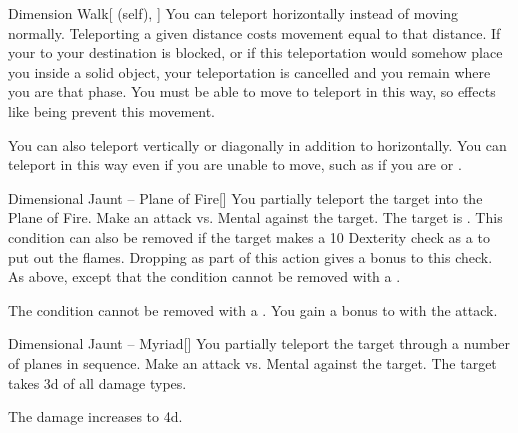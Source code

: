 \lowercase{\hypertarget{spell:Dimension Walk}{}}\label{spell:Dimension Walk}
\begin{attuneability}[Rank 4]{\hypertarget{spell:Dimension Walk}{Dimension Walk}}[ (self), ]
You can teleport horizontally instead of moving normally.
Teleporting a given distance costs movement equal to that distance.
If your  to your destination is blocked, or if this teleportation would somehow place you inside a solid object, your teleportation is cancelled and you remain where you are that phase.
You must be able to move to teleport in this way, so effects like being  prevent this movement.

\rankline
{} You can also teleport vertically or diagonally in addition to horizontally.
 You can teleport in this way even if you are unable to move, such as if you are  or .
\end{attuneability}
\vspace{0.25em}



\lowercase{\hypertarget{spell:Dimensional Jaunt -- Plane of Fire}{}}\label{spell:Dimensional Jaunt -- Plane of Fire}
\begin{freeability}[Rank 4]{\hypertarget{spell:Dimensional Jaunt -- Plane of Fire}{Dimensional Jaunt -- Plane of Fire}}[]
You partially teleport the target into the Plane of Fire.
Make an attack vs. Mental against the target.
\hit The target is .
This condition can also be removed if the target makes a  10 Dexterity check as a  to put out the flames.
Dropping  as part of this action gives a  bonus to this check.
\crit As above, except that the condition cannot be removed with a .

\rankline
{} The condition cannot be removed with a .
 You gain a  bonus to  with the attack.
\end{freeability}
\vspace{0.25em}



\lowercase{\hypertarget{spell:Dimensional Jaunt -- Myriad}{}}\label{spell:Dimensional Jaunt -- Myriad}
\begin{freeability}[Rank 5]{\hypertarget{spell:Dimensional Jaunt -- Myriad}{Dimensional Jaunt -- Myriad}}[]
You partially teleport the target through a number of planes in sequence.
Make an attack vs. Mental against the target.
\hit The target takes  \plus3d of all damage types.

\rankline
{} The damage increases to  \plus4d.
\end{freeability}
\vspace{0.25em}



